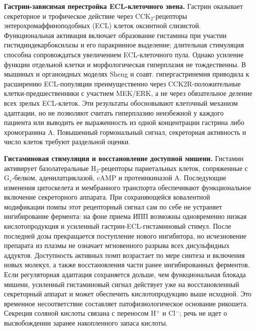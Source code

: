 \documentclass[11pt,a4paper,notitlepage]{report}
\newcommand{\src}[1]{\unskip\space\cite{#1}}
\begin{document}
\textbf{Гастрин-зависимая перестройка ECL-клеточного звена.} Гастрин оказывает секреторное и трофическое действие через CCK$_2$-рецепторы энтерохромаффиноподобных (ECL) клеток оксинтной слизистой. Функциональная активация включает образование гистамина при участии гистидиндекарбоксилазы и его паракринное выделение; длительная стимуляция способна сопровождаться увеличением ECL-клеточного пула. Однако усиление функции отдельной клетки и морфологическая гиперплазия не тождественны. В мышиных и органоидных моделях Sheng и соавт. гипергастринемия приводила к расширению ECL-популяции преимущественно через CCK2R-положительные клетки-предшественники с участием MEK/ERK, а не через обязательное деление всех зрелых ECL-клеток. Эти результаты обосновывают клеточный механизм адаптации, но не позволяют считать гиперплазию неизбежной у каждого пациента или выводить ее выраженность из одной концентрации гастрина либо хромогранина A. Повышенный гормональный сигнал, секреторная активность и число клеток требуют раздельной оценки.\src{withdrawsheng2020,molcck,vision2025}

\textbf{Гистаминовая стимуляция и восстановление доступной мишени.} Гистамин активирует базолатеральные H$_2$-рецепторы париетальных клеток, сопряженные с G$_s$-белком, аденилатциклазой, cAMP и протеинкиназой A. Последующие изменения цитоскелета и мембранного транспорта обеспечивают функциональное включение секреторного аппарата. При сохраняющейся ковалентной модификации помпы этот рецепторный сигнал сам по себе не устраняет ингибирование фермента: на фоне приема ИПП возможны одновременно низкая кислотопродукция и усиленный гастрин-ECL-гистаминовый стимул.\src{molh2signal,molezrin,molcys} После последней дозы прекращается поступление нового ингибитора, но исчезновение препарата из плазмы не означает мгновенного разрыва всех дисульфидных аддуктов. Доступность активных помп возрастает по мере синтеза и включения новых молекул, а также восстановления части ранее ингибированных ферментов. Если регуляторная адаптация сохраняется дольше, чем функциональная блокада мишени, усиленный гистаминовый сигнал действует уже на восстановленный секреторный аппарат и может обеспечить кислотопродукцию выше исходной. Это временное несоответствие составляет патофизиологическое основание рикошета. Секреция соляной кислоты связана с переносом H$^+$ и Cl$^-$; речь не идет о высвобождении заранее накопленного запаса кислоты.\src{molrestore,molcys,molslc26,withdrawwaldum1996}
\end{document}
